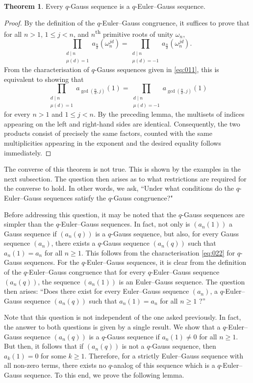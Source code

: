 \documentclass{article}
\numberwithin{equation}{section}
\theoremstyle{definition}
\newtheorem{theorem}[definition]{\bf {Theorem}}
\begin{document}
\begin{theorem}\label{thm:5}
Every $q$-Gauss sequence is a $q$-Euler--Gauss sequence.
\end{theorem}
\begin{proof}
By the definition of the $q$-Euler--Gauss congruence, it suffices to prove that for all $n>1$, $1\leq j<n$, and $n$\textsuperscript{th} primitive roots of unity $\omega_n$,
\[
\prod_{\substack{d\mid n \\ \mu(d)=1}} a_\frac{n}{d}(\omega_n^{jd})
=
\prod_{\substack{d\mid n \\ \mu(d)=-1}} a_\frac{n}{d}(\omega_n^{jd}).
\]
From the characterisation of $q$-Gauss sequences given in \eqref{eq:011}, this is equivalent to showing that
\[
\prod_{\substack{d\mid n \\ \mu(d)=1}} a_{\gcd(\frac{n}{d},j)}(1)
=
\prod_{\substack{d\mid n \\ \mu(d)=-1}} a_{\gcd(\frac{n}{d},j)}(1)
\]
for every $n>1$ and $1\leq j<n$. By the preceding lemma, the multisets of indices appearing on the left and right-hand sides are identical. Consequently, the two products consist of precisely the same factors, counted with the same multiplicities appearing in the exponent and the desired equality follows immediately.
\end{proof}


The converse of this theorem is not true. This is shown by the examples in the next subsection. The question then arises as to what restrictions are required for the converse to hold. In other words, we ask, ``Under what conditions do the $q$-Euler--Gauss sequences satisfy the $q$-Gauss congruence?" 

Before addressing this question, it may be noted that the $q$-Gauss sequences are simpler than the $q$-Euler--Gauss sequences. In fact, not only is $(a_n(1))$ a Gauss sequence if $(a_n(q))$ is a $q$-Gauss sequence, but also, for every Gauss sequence $(a_n)$, there exists a $q$-Gauss sequence $(a_n(q))$ such that $a_n(1)=a_n$ for all $n\geq1$. This follows from the characterisation \eqref{eq:022} for $q$-Gauss sequences. For the $q$-Euler--Gauss sequences, it is clear from the definition of the $q$-Euler--Gauss congruence that for every $q$-Euler--Gauss sequence $(a_n(q))$, the sequence $(a_n(1))$ is an Euler--Gauss sequence. The question then arises: ``Does there exist for every Euler--Gauss sequence  $(a_n)$, a $q$-Euler--Gauss sequence $(a_n(q))$ such that $a_n(1)=a_n$ for all $n\geq1$ ?''


Note that this question is not independent of the one asked previously. In fact, the answer to both questions is given by a single result. We show that a $q$-Euler--Gauss sequence $(a_n(q))$ is a $q$-Gauss sequence if $a_n(1)\neq0$ for all $n\geq1$. But then, it follows that if $(a_n(q))$ is not a $q$-Gauss sequence, then $a_k(1)=0$ for some $k\geq1$. Therefore, for a strictly Euler--Gauss sequence with all non-zero terms, there exists no $q$-analog of this sequence which is a $q$-Euler--Gauss sequence. To this end, we prove the following lemma.
 
\end{document}
